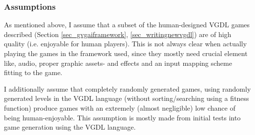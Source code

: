 \documentclass[a4paper,titlepage,final]{report}
\begin{document}




\subsubsection*{Assumptions}
As mentioned above, I assume that a subset of the human-designed VGDL games described (Section \ref{sec_gvgaiframework}, \ref{sec_writingnewvgdl}) are of high quality (i.e. enjoyable for human players). 
This is not always clear when actually playing the games in the framework used, since they mostly need crucial element like, audio, proper graphic assets- and effects and an input mapping scheme fitting to the game.

I additionally assume that completely randomly generated games, using randomly generated levels in the VGDL language (without sorting/searching using a fitness function) produce games with an extremely (almost negligible) low chance of being human-enjoyable.
This assumption is mostly made from initial tests into game generation using the VGDL language.
\end{document}

